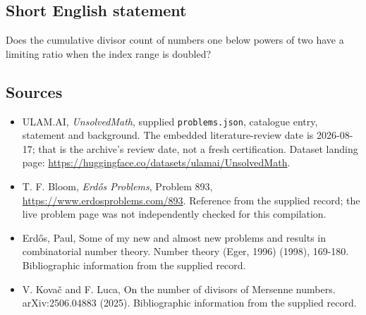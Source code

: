 \documentclass[11pt,a4paper]{article}
\begin{document}
\subsection{Short English statement}

Does the cumulative divisor count of numbers one below powers of two have a limiting ratio when the index range is doubled?

\subsection{Sources}

{\small

\begin{itemize}

\item[\hypertarget{source:statement:1}{S1}] ULAM.AI, \emph{UnsolvedMath}, supplied \texttt{problems.json}, catalogue entry, statement and background. The embedded literature-review date is 2026-08-17; that is the archive’s review date, not a fresh certification. Dataset landing page: \url{https://huggingface.co/datasets/ulamai/UnsolvedMath}.

\item[\hypertarget{source:statement:2}{S2}] T. F. Bloom, \emph{Erdős Problems}, Problem 893, \url{https://www.erdosproblems.com/893}. Reference from the supplied record; the live problem page was not independently checked for this compilation.

\item[\hypertarget{source:statement:3}{S3}] Erd\H{o}s, Paul, Some of my new and almost new problems and results in combinatorial number theory. Number theory (Eger, 1996) (1998), 169-180. Bibliographic information from the supplied record.

\item[\hypertarget{source:statement:4}{S4}] V. Kova\v{c} and F. Luca, On the number of divisors of Mersenne numbers. arXiv:2506.04883 (2025). Bibliographic information from the supplied record.

\end{itemize}

}

\label{end:statement}
\end{document}
